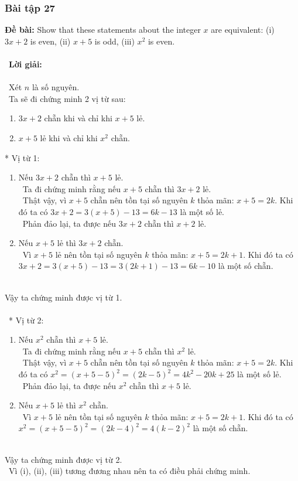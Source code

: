 \documentclass[a4paper]{article}
\begin{document}
\subsubsection{Bài tập 27}
\textbf{Đề bài: }Show that these statements about the integer $x$ are equivalent: (i) $3x + 2$ is even, (ii) $x + 5$ is odd,
(iii) $x^2$ is even.\\ \\\
\textbf{Lời giải:} \\\ \\\
Xét $n$ là số nguyên. \\\
Ta sẽ đi chứng minh 2 vị từ sau:
\begin{enumerate}
\item $3x + 2$ chẵn khi và chỉ khi $x + 5$ lẻ.
\item $x+5$ lẻ khi và chỉ khi $x^2$ chẵn.
\end{enumerate}
* Vị từ 1:
\begin{enumerate}
\item Nếu $3x+2$ chẵn thì $x+5$ lẻ. \\\
Ta đi chứng minh rằng nếu $x+5$ chẵn thì $3x+2$ lẻ. \\\
Thật vậy, vì $x+5$ chẵn nên tồn tại số nguyên $k$ thỏa mãn: $x+5 = 2k$. Khi đó ta có $3x+2=3(x+5)-13=6k-13$ là một số lẻ.  \\\
Phản đảo lại, ta được nếu $3x+2$ chẵn thì $x+2$ lẻ.
\item Nếu $x+5$ lẻ thì $3x+2$ chẵn. \\\
Vì $x+5$ lẻ nên tồn tại số nguyên $k$ thỏa mãn: $x+5 = 2k+1$. Khi đó ta có $3x+2=3(x+5)-13=3(2k+1)-13 = 6k-10$ là một số chẵn.  \\\
\end{enumerate}
Vậy ta chứng minh được vị từ 1. \\\ \\\
* Vị từ 2:
\begin{enumerate}
\item Nếu $x^2$ chẵn thì $x+5$ lẻ. \\\
Ta đi chứng minh rằng nếu $x+5$ chẵn thì $x^2$ lẻ. \\\
Thật vậy, vì $x+5$ chẵn nên tồn tại số nguyên $k$ thỏa mãn: $x+5 = 2k$. Khi đó ta có $x^2 = (x+5-5)^2=(2k-5)^2 = 4k^2-20k+25$ là một số lẻ.  \\\
Phản đảo lại, ta được nếu $x^2$ chẵn thì $x+5$ lẻ.
\item Nếu $x+5$ lẻ thì $x^2$ chẵn. \\\
Vì $x+5$ lẻ nên tồn tại số nguyên $k$ thỏa mãn: $x+5 = 2k+1$. Khi đó ta có $x^2 = (x+5-5)^2=(2k-4)^2=4(k-2)^2$ là một số chẵn.  \\\
\end{enumerate}
Vậy ta chứng minh được vị từ 2. \\\
Vì (i), (ii), (iii) tương đương nhau nên ta có điều phải chứng minh.
\clearpage
\end{document}
